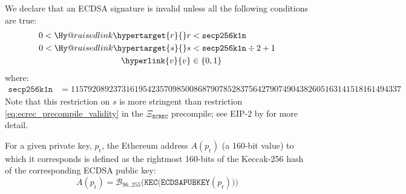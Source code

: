 \documentclass[9pt,oneside]{amsart}
\makeatletter
\newcommand{\linkdest}[1]{\Hy@raisedlink{\hypertarget{#1}{}}}
\makeatother
\begin{document}
\linkdest{invalidsig}We declare that an ECDSA signature is invalid unless all the following conditions are true:
\begin{align}
0 < \linkdest{r}{r} &< \mathtt{secp256k1n} \\
0 < \linkdest{s}{s} &< \mathtt{secp256k1n} \div 2 + 1 \\
\hyperlink{v}{v} &\in \{0,1\}
\end{align}
where:
\begin{align}
\mathtt{secp256k1n} &= 115792089237316195423570985008687907852837564279074904382605163141518161494337
\end{align}
Note that this restriction on $s$ is more stringent than restriction \ref{eq:ecrec_precompile_validity} in the $\Xi_{\mathtt{ECREC}}$ precompile; see EIP-2 by \cite{EIP-2} for more detail.

For a given private key, $p_{\mathrm{r}}$, the Ethereum address $A(p_{\mathrm{r}})$ (a 160-bit value) to which it corresponds is defined as the rightmost 160-bits of the Keccak-256 hash of the corresponding ECDSA public key:
\begin{equation}
A(p_{\mathrm{r}}) = \mathcal{B}_{96..255}\big(\mathtt{KEC}\big( \mathtt{ECDSAPUBKEY}(p_{\mathrm{r}}) \big) \big)
\end{equation}
\end{document}
